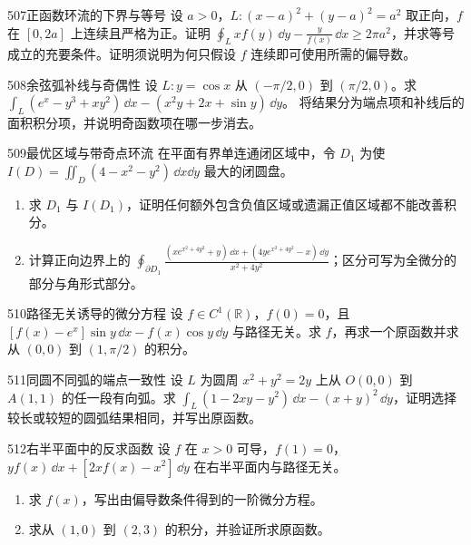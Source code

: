 \begin{exercise}{507}{正函数环流的下界与等号}
设 $a>0$，$L:(x-a)^2+(y-a)^2=a^2$ 取正向，$f$ 在 $[0,2a]$ 上连续且严格为正。证明
$\oint_Lxf(y)\,\dd y-\frac y{f(x)}\,\dd x\geq2\pi a^2$，并求等号成立的充要条件。证明须说明为何只假设 $f$ 连续即可使用所需的偏导数。
\end{exercise}

\begin{exercise}{508}{余弦弧补线与奇偶性}
设 $L:y=\cos x$ 从 $(-\pi/2,0)$ 到 $(\pi/2,0)$。求
$\int_L(e^x-y^3+xy^2)\,\dd x-(x^2y+2x+\sin y)\,\dd y$。
将结果分为端点项和补线后的面积积分项，并说明奇函数项在哪一步消去。
\end{exercise}

\begin{exercise}{509}{最优区域与带奇点环流}
在平面有界单连通闭区域中，令 $D_1$ 为使 $I(D)=\iint_D(4-x^2-y^2)\,\dd x\dd y$ 最大的闭圆盘。
\begin{enumerate}[label=(\arabic*)]
\item 求 $D_1$ 与 $I(D_1)$，证明任何额外包含负值区域或遗漏正值区域都不能改善积分。
\item 计算正向边界上的
$\oint_{\partial D_1}\frac{(xe^{x^2+4y^2}+y)\,\dd x+(4ye^{x^2+4y^2}-x)\,\dd y}{x^2+4y^2}$；区分可写为全微分的部分与角形式部分。
\end{enumerate}
\end{exercise}

\begin{exercise}{510}{路径无关诱导的微分方程}
设 $f\in C^1(\mathbb R)$，$f(0)=0$，且 $[f(x)-e^x]\sin y\,\dd x-f(x)\cos y\,\dd y$ 与路径无关。求 $f$，再求一个原函数并求从 $(0,0)$ 到 $(1,\pi/2)$ 的积分。
\end{exercise}

\begin{exercise}{511}{同圆不同弧的端点一致性}
设 $L$ 为圆周 $x^2+y^2=2y$ 上从 $O(0,0)$ 到 $A(1,1)$ 的任一段有向弧。求 $\int_L(1-2xy-y^2)\,\dd x-(x+y)^2\,\dd y$，证明选择较长或较短的圆弧结果相同，并写出原函数。
\end{exercise}

\begin{exercise}{512}{右半平面中的反求函数}
设 $f$ 在 $x>0$ 可导，$f(1)=0$，$yf(x)\,\dd x+[2xf(x)-x^2]\,\dd y$ 在右半平面内与路径无关。
\begin{enumerate}[label=(\arabic*)]
\item 求 $f(x)$，写出由偏导数条件得到的一阶微分方程。
\item 求从 $(1,0)$ 到 $(2,3)$ 的积分，并验证所求原函数。
\end{enumerate}
\end{exercise}

